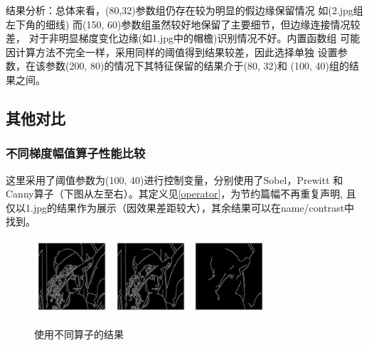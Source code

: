 \documentclass{article}
\begin{document}
\newpage
    结果分析：总体来看，(80,32)参数组仍存在较为明显的假边缘保留情况
    如(2.jpg组左下角的细线)
    而(150, 60)参数组虽然较好地保留了主要细节，但边缘连接情况较差，
    对于非明显梯度变化边缘(如1.jpg中的帽檐)识别情况不好。内置函数组
    可能因计算方法不完全一样，采用同样的阈值得到结果较差，因此选择单独
    设置参数，在该参数(200, 80)的情况下其特征保留的结果介于(80, 32)和
    (100, 40)组的结果之间。
    
\subsection{其他对比}
\subsubsection{不同梯度幅值算子性能比较}
    这里采用了阈值参数为(100, 40)进行控制变量，分别使用了Sobel，Prewitt
    和Canny算子（下图从左至右）。其定义见\ref{operator}，为节约篇幅不再重复声明,
    且仅以1.jpg的结果作为展示（因效果差距较大），其余结果可以在name/contrast中找到。

\begin{figure}[h]
    \centering
    \includegraphics[width=0.25\textwidth]{./contrast/1_sobel}
    \includegraphics[width=0.25\textwidth]{./contrast/1_prewitt}
    \includegraphics[width=0.25\textwidth]{./contrast/1_canny}
    \caption{使用不同算子的结果}
\end{figure}
\end{document}
